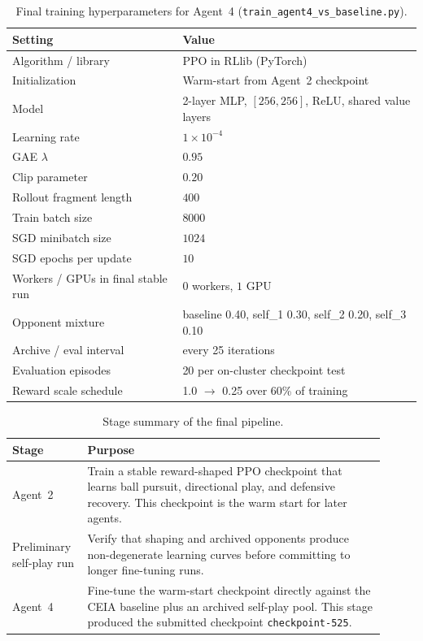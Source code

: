 \documentclass{article}
\begin{document}
\begin{table}[t]
\centering
\small
\caption{Final training hyperparameters for Agent~4 (\texttt{train\_agent4\_vs\_baseline.py}).}
\label{tab:hparams}
\begin{tabular}{ll}
\toprule
Setting & Value \\
\midrule
Algorithm / library & PPO in RLlib (PyTorch) \\
Initialization & Warm-start from Agent~2 checkpoint \\
Model & 2-layer MLP, $[256,256]$, ReLU, shared value layers \\
Learning rate & $1\times 10^{-4}$ \\
GAE $\lambda$ & $0.95$ \\
Clip parameter & $0.20$ \\
Rollout fragment length & $400$ \\
Train batch size & $8000$ \\
SGD minibatch size & $1024$ \\
SGD epochs per update & $10$ \\
Workers / GPUs in final stable run & $0$ workers, $1$ GPU \\
Opponent mixture & baseline 0.40, self\_1 0.30, self\_2 0.20, self\_3 0.10 \\
Archive / eval interval & every 25 iterations \\
Evaluation episodes & 20 per on-cluster checkpoint test \\
Reward scale schedule & 1.0 $\rightarrow$ 0.25 over 60\% of training \\
\bottomrule
\end{tabular}
\end{table}

\begin{table}[t]
\centering
\small
\caption{Stage summary of the final pipeline.}
\label{tab:stages}
\begin{tabular}{p{0.17\linewidth}p{0.74\linewidth}}
\toprule
Stage & Purpose \\
\midrule
Agent~2 & Train a stable reward-shaped PPO checkpoint that learns ball pursuit, directional play, and defensive recovery. This checkpoint is the warm start for later agents. \\
Preliminary self-play run & Verify that shaping and archived opponents produce non-degenerate learning curves before committing to longer fine-tuning runs. \\
Agent~4 & Fine-tune the warm-start checkpoint directly against the CEIA baseline plus an archived self-play pool. This stage produced the submitted checkpoint \texttt{checkpoint-525}. \\
\bottomrule
\end{tabular}
\end{table}
\end{document}
